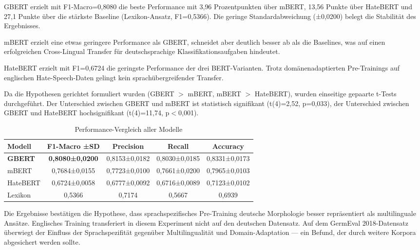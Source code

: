 ﻿\documentclass[11pt,a4paper]{article}
\begin{document}
GBERT erzielt mit F1-Macro=0{,}8080 die beste Performance mit 3{,}96 Prozentpunkten über mBERT, 13{,}56 Punkte über HateBERT und 27{,}1 Punkte über die stärkste Baseline (Lexikon-Ansatz, F1=0{,}5366). Die geringe Standardabweichung (±0{,}0200) belegt die Stabilität des Ergebnisses.

mBERT erzielt eine etwas geringere Performance als GBERT, schneidet aber deutlich besser ab als die Baselines, was auf einen erfolgreichen Cross-Lingual Transfer für deutschsprachige Klassifikationsaufgaben hindeutet.

HateBERT erzielt mit F1=0{,}6724 die geringste Performance der drei BERT-Varianten. Trotz domänenadaptierten Pre-Trainings auf englischen Hate-Speech-Daten gelingt kein sprachübergreifender Transfer. 

Da die Hypothesen gerichtet formuliert wurden (GBERT $>$ mBERT, mBERT $>$ HateBERT), wurden einseitige gepaarte t-Tests durchgeführt. Der Unterschied zwischen GBERT und mBERT ist statistisch signifikant (t(4)=2{,}52, p=0{,}033), der Unterschied zwischen GBERT und HateBERT hochsignifikant (t(4)=11{,}74, p$<$0{,}001).

\begin{table}[h]
\centering
\small
\begin{tabular}{lcccc}
\toprule
\textbf{Modell} & \textbf{F1-Macro ±SD} & \textbf{Precision} & \textbf{Recall} & \textbf{Accuracy} \\
\midrule
\textbf{GBERT} & \textbf{0,8080±0,0200}& 0,8153±0,0182 & 0,8030±0,0185 & 0,8331±0,0173 \\
mBERT & 0,7684±0,0155 & 0,7723±0,0100 & 0,7661±0,0200 & 0,7965±0,0103 \\
HateBERT & 0,6724±0,0058 & 0,6777±0,0092 & 0,6716±0,0089 & 0,7123±0,0102 \\
\midrule
Lexikon & 0,5366 & 0,7174 & 0,5667 & 0,6939 \\
\bottomrule
\end{tabular}
\caption{Performance-Vergleich aller Modelle}
\end{table}

Die Ergebnisse bestätigen die Hypothese, dass sprachspezifisches Pre-Training deutsche Morphologie besser repräsentiert als multilinguale Ansätze. Englisches Training transferiert in diesem Experiment nicht auf den deutschen Datensatz. Auf dem GermEval 2018-Datensatz überwiegt der Einfluss der Sprachspezifität gegenüber Multilingualität und Domain-Adaptation — ein Befund, der durch weitere Korpora abgesichert werden sollte.
\end{document}
